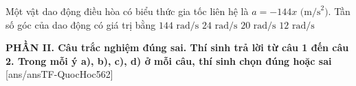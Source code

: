 \begin{ex}	Một vật dao động điều hòa có biểu thức gia tốc liên hệ là $a = -144x\text{ (m/s}^2)$. Tần số góc của dao động có giá trị bằng
	\choice
	{$144\text{ rad/s}$}
	{$24\text{ rad/s}$}
	{$20\text{ rad/s}$}
	{\True $12\text{ rad/s}$}
\end{ex}


\noindent \textbf{PHẦN II. Câu trắc nghiệm đúng sai. Thí sinh trả lời từ câu 1 đến câu 2. Trong mỗi ý a), b), c), d) ở mỗi câu, thí sinh chọn đúng hoặc sai}
[ans/ansTF-QuocHoc562]

